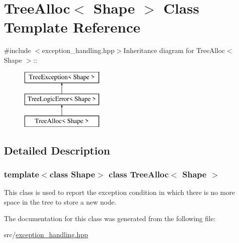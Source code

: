 \hypertarget{classTreeAlloc}{
\section{TreeAlloc$<$ Shape $>$ Class Template Reference}
\label{classTreeAlloc}
}


{\ttfamily \#include $<$exception\_\-handling.hpp$>$}Inheritance diagram for TreeAlloc$<$ Shape $>$::\begin{figure}[H]
\begin{center}
\leavevmode
\includegraphics[height=3cm]{classTreeAlloc}
\end{center}
\end{figure}


\subsection{Detailed Description}
\subsubsection*{template$<$class Shape$>$ class TreeAlloc$<$ Shape $>$}

This class is used to report the exception condition in which there is no more space in the tree to store a new node. 

The documentation for this class was generated from the following file:\begin{DoxyCompactItemize}
\item 
src/\hyperlink{exception__handling_8hpp}{exception\_\-handling.hpp}\end{DoxyCompactItemize}
